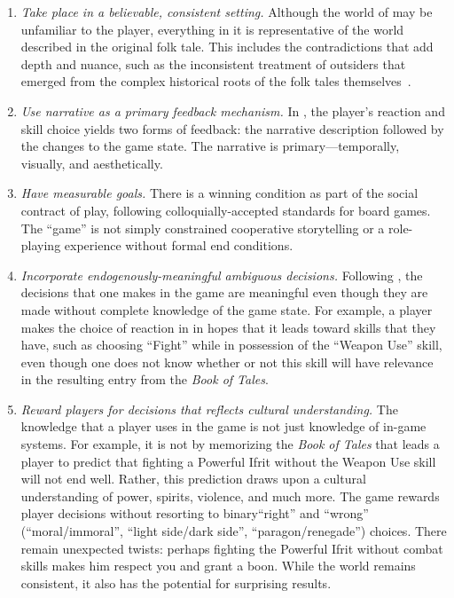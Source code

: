 \documentclass[a4paper]{article}
\begin{document}
\begin{enumerate}
\item \textit{Take place in a believable, consistent setting.} 
 Although the world of \totan{} may be unfamiliar to the player,
 everything in it is representative of the world described in the original
 folk tale.
 This includes the contradictions that add depth and nuance, such as 
 the inconsistent treatment of outsiders that emerged from the 
 complex historical roots of the folk tales themselves~\citep{Matar2008}.

\item \textit{Use narrative as a primary feedback mechanism.} 
 In \totan{}, the player's reaction and skill choice yields two forms
 of feedback: the narrative description followed by the changes to the
 game state. The narrative is primary---temporally, visually, and aesthetically.

\item \textit{Have measurable goals.} There is a winning condition as part
 of the social contract of play, following colloquially-accepted 
 standards for board games. The ``game'' is not simply constrained
 cooperative storytelling or a role-playing experience without formal end
 conditions. 

\item \textit{Incorporate endogenously-meaningful ambiguous decisions.}
 Following \citet{Burgun2012}, the decisions that one makes in the game
 are meaningful even though they are made without complete knowledge
 of the game state. For example, a player makes 
 the choice of reaction in \totan{} in hopes that it leads toward skills
 that they have, such as choosing ``Fight'' while in possession of the
 ``Weapon Use'' skill, even though one does not know whether or not
 this skill will have relevance in the resulting entry from the
 \textit{Book of Tales}.

\item \textit{Reward players for decisions that reflects
    cultural understanding.}  The knowledge that a player uses in the game
  is not just knowledge of in-game systems. 
  For example, it is not by memorizing the \textit{Book of Tales}
  that leads a player to predict that fighting a Powerful Ifrit without
 the Weapon Use skill will not end well.
  Rather, this prediction draws upon a cultural understanding of power,
  spirits, violence, and much more.
  The game rewards player decisions without resorting to
  binary``right'' and ``wrong'' (``moral/immoral'',
  ``light side/dark side'', ``paragon/renegade'') choices.  There
  remain unexpected twists: perhaps fighting the Powerful Ifrit without
  combat skills makes him respect you and grant a boon. 
  While the world
  remains consistent, it also has the potential for surprising
  results.

\end{enumerate}
\end{document}

